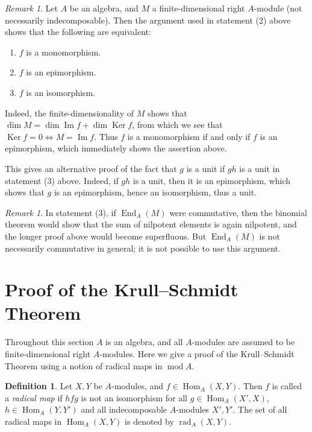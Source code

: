 \documentclass{surv-l}
\numberwithin{equation}{chapter}
\numberwithin{figure}{chapter}
\theoremstyle{plain}
\theoremstyle{definition}
\newtheorem{dfn}[thm]{Definition}
\theoremstyle{remark}
\newtheorem{rmk}[thm]{Remark}
\DeclareMathOperator{\Ker}{Ker}
\DeclareMathOperator{\Hom}{Hom}
\DeclareMathOperator{\rad}{rad}
\DeclareMathOperator{\End}{End}
\begin{document}
\begin{rmk}
Let $A$ be an algebra, and $M$ a finite-dimensional right $A$-module
(not necessarily indecomposable).
Then the argument used in statement (2) above shows that the following are equivalent:

\begin{enumerate}[label=(\alph*)]
\item
$f$ is a monomorphism.
\item
$f$ is an epimorphism.
\item
$f$ is an isomorphism.
\end{enumerate}
Indeed, the finite-dimensionality of $M$ shows that
$\dim M = \dim \operatorname{Im} f + \dim \Ker f$, from which we see that
$\Ker f = 0 \iff M = \operatorname{Im} f$.
Thus $f$ is a monomorphism if and only if $f$ is an epimorphism,
which immediately shows the assertion above.

This gives an alternative proof of the fact that $g$ is a unit if $gh$ is a unit
in statement (3) above.
Indeed, if $gh$ is a unit, then it is an epimorphism,
which shows that $g$ is an epimorphism, hence an isomorphism, thus a unit.
\end{rmk}

\begin{rmk}
In statement (3), if $\End_A(M)$ were commutative,
then the binomial theorem would show that
the sum of nilpotent elements is again nilpotent,
and the longer proof above would become superfluous.
But $\End_A(M)$ is not necessarily commutative in general; it is not possible
to use this argument.
\end{rmk}

\section{Proof of the Krull--Schmidt Theorem}\label{sec:KS-Thm}\label{app:b.3}

Throughout this section $A$ is an algebra, and all $A$-modules are assumed to be
finite-dimensional right $A$-modules.
Here we give a proof of the Krull--Schmidt Theorem using a notion of
radical maps in $\operatorname{mod} A$.

\begin{dfn}
Let $X, Y$ be $A$-modules, and $f \in \Hom_A(X, Y)$.
Then $f$ is called a \emph{radical map} if
$hfg$ is not an isomorphism for all $g \in \Hom_A(X', X)$,
$h \in \Hom_A(Y, Y')$ and all indecomposable $A$-modules $X', Y'$.
The set of all radical maps in $\Hom_A(X, Y)$ is denoted by
$\rad_A(X, Y)$.
\end{dfn}
\end{document}
